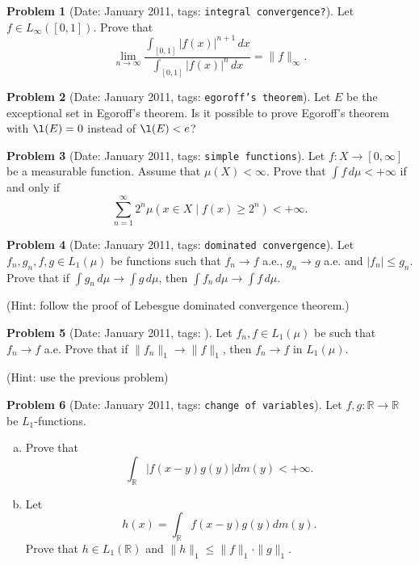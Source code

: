 \documentclass[11pt, notitlepage]{article}
\theoremstyle{definition}
\theoremstyle{definition}
\theoremstyle{definition}
\newtheorem{probstate}{Problem}
\theoremstyle{remark}
\newenvironment{problem}[2]{
    \begin{probstate}[Date: #1, tags: \texttt{#2}]
}
{
  \end{probstate}
}
\begin{document}
\begin{problem}{January 2011}{integral convergence?}
  Let $f \in L_{\infty}([0,1])$. Prove that
 \[
   \lim_{n \to \infty} \frac{\int_{[0,1]} |f(x)|^{n+1} \, dx}{\int_{[0,1]} |f(x)|^{n} \, dx} = \|f\|_{\infty}.
 \]

\end{problem}

\begin{problem}{January 2011}{egoroff's theorem}
  Let $E$ be the exceptional set in Egoroff's theorem.
    Is it possible to prove Egoroff's theorem with
    $\l(E)=0$ instead of $\l(E) < e$?
\end{problem}

\begin{problem}{January 2011}{simple functions}
  Let $f:X \to [0, \infty]$ be a measurable
 function. Assume that $\mu (X) < \infty$.
 Prove that $\int f \, d \mu< +\infty$ if and only if
 \[
 \sum_{n=1}^{\infty} 2^n \mu (x \in X \mid f(x) \ge 2^n) < +\infty.
 \]
\end{problem}

\begin{problem}{January 2011}{dominated convergence}
  Let $f_n,g_n,f,g \in L_1(\mu)$ be functions such that
    $f_n \to f$ a.e., $g_n \to g$ a.e. and $|f_n| \le g_n$. Prove
    that if $\int g_n \, d \mu \to \int g \, d \mu$, then
    $\int f_n \, d \mu \to \int f \, d \mu$.

    (Hint: follow the proof of Lebesgue dominated convergence
    theorem.)
\end{problem}

\begin{problem}{January 2011}{}
  Let $f_n,f \in L_1(\mu)$ be such that $f_n \to f$ a.e.
    Prove that if \newline
    $\|f_n\|_1 \to \|f\|_1$,
    then $f_n \to f$ in $L_1(\mu)$.

    (Hint: use the previous problem)

\end{problem}


\begin{problem}{January 2011}{change of variables}
  Let $f,g: \mathbb R \rightarrow \mathbb R$ be $L_1$-functions.
  \begin{enumerate}[(a)]
\item Prove that
\[
\int_{\mathbb R} |f(x-y)g(y)| dm(y) < +\infty.
\]
  \item Let
\[
h(x)= \int_{\mathbb R} f(x-y)g(y) dm(y).
\]
Prove that $h \in L_1(\mathbb R)$ and $\|h\|_1 \le \|f\|_1 \cdot \|g\|_1$.
\end{enumerate}
\end{problem}
\end{document}
